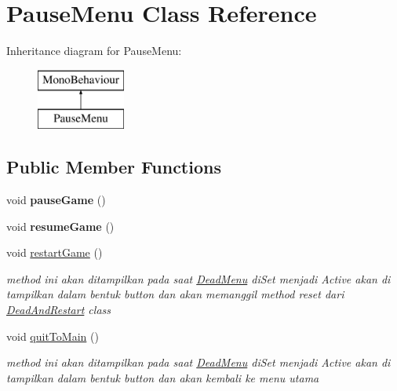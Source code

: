\hypertarget{class_pause_menu}{}\section{Pause\+Menu Class Reference}
\label{class_pause_menu}
Inheritance diagram for Pause\+Menu\+:\begin{figure}[H]
\begin{center}
\leavevmode
\includegraphics[height=2.000000cm]{class_pause_menu}
\end{center}
\end{figure}
\subsection*{Public Member Functions}
\begin{DoxyCompactItemize}
\item 
\hypertarget{class_pause_menu_af497942ddf1f2b7eb11c054c865353ec}{}\label{class_pause_menu_af497942ddf1f2b7eb11c054c865353ec} 
void {\bfseries pause\+Game} ()
\item 
\hypertarget{class_pause_menu_a8eea4a2ea1b10e58d6b376899a2966d3}{}\label{class_pause_menu_a8eea4a2ea1b10e58d6b376899a2966d3} 
void {\bfseries resume\+Game} ()
\item 
void \hyperlink{class_pause_menu_ac64b5f82050f56e6553e7b60e926c1ed}{restart\+Game} ()
\begin{DoxyCompactList}\small\item\em method ini akan ditampilkan pada saat \hyperlink{class_dead_menu}{Dead\+Menu} di\+Set menjadi Active akan di tampilkan dalam bentuk button dan akan memanggil method reset dari \hyperlink{class_dead_and_restart}{Dead\+And\+Restart} class \end{DoxyCompactList}\item 
void \hyperlink{class_pause_menu_abd6872204e8867b9823bce94cbb36b54}{quit\+To\+Main} ()
\begin{DoxyCompactList}\small\item\em method ini akan ditampilkan pada saat \hyperlink{class_dead_menu}{Dead\+Menu} di\+Set menjadi Active akan di tampilkan dalam bentuk button dan akan kembali ke menu utama \end{DoxyCompactList}\end{DoxyCompactItemize}
